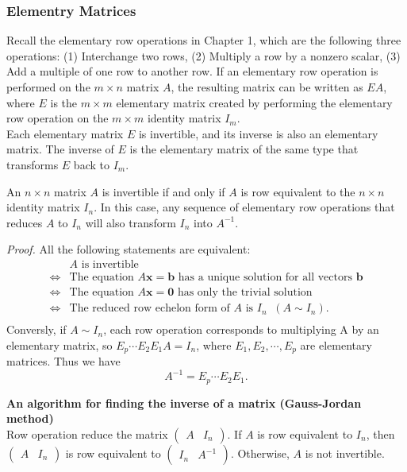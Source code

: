 \documentclass[10pt, a4paper]{article}
\begin{document}
\subsubsection*{Elementry Matrices}
Recall the elementary row operations in Chapter 1, which are the following three operations: (1) Interchange two rows, (2) Multiply a row by a nonzero scalar, (3) Add a multiple of one row to another row. 
If an elementary row operation is performed on the $m\times n$ matrix $A$, the resulting matrix can be written as $EA$, where $E$ is the $m\times m$ elementary matrix created by performing the elementary row operation on the $m\times m$ identity matrix $I_m$.\\
\indent Each elementary matrix $E$ is invertible, and its inverse is also an elementary matrix. The inverse of $E$ is the elementary matrix of the same type that transforms $E$ back to $I_m$.
\begin{proposition}
    An $n\times n$ matrix $A$ is invertible if and only if $A$ is row equivalent to the $n\times n$ identity matrix $I_n$. In this case, any sequence of elementary row operations that reduces $A$ to $I_n$ will also transform $I_n$ into $A^{-1}$.
\end{proposition}
\textit{Proof.} All the following statements are equivalent:
\begin{align*}
    & A \text{ is invertible}                                                                                   \\
    \Leftrightarrow & \text{The equation } A\mathbf{x} = \mathbf{b} \text{ has a unique solution for all vectors } \mathbf{b} \\
    \Leftrightarrow & \text{The equation } A\mathbf{x} = \mathbf{0} \text{ has only the trivial solution}                 \\
    \Leftrightarrow & \text{The reduced row echelon form of } A \text{ is } I_n \; \; (A \sim I_n).                                        \\
\end{align*}
Conversly, if $A\sim I_n$, each row operation corresponds to multiplying A by an elementary matrix, so $E_p \cdots E_2 E_1A=I_n$, where $E_1, E_2, \cdots, E_p$ are elementary matrices. Thus we have $$A^{-1} = E_p \cdots E_2 E_1.$$
\begin{proposition}
    \textbf{An algorithm for finding the inverse of a matrix (Gauss-Jordan method)}\\
    Row operation reduce the matrix $\begin{pmatrix} A & I_n \end{pmatrix}$. If $A$ is row equivalent to $I_n$, then $\begin{pmatrix} A & I_n \end{pmatrix}$ is row equivalent to $\begin{pmatrix} I_n & A^{-1} \end{pmatrix}$. Otherwise, $A$ is not invertible.
\end{proposition}
\end{document}

